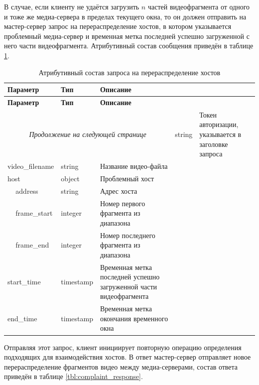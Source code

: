 В случае, если клиенту не удаётся загрузить $n$ частей видеофрагмента от одного и тоже же медиа-сервера в пределах текущего окна, то он должен отправить на мастер-сервер запрос на перераспределение хостов, в котором указывается проблемный медиа-сервер и временная метка последней успешно загруженной с него части видеофрагмента. Атрибутивный состав сообщения приведён в таблице \ref{tbl:complaint_request}.

\begin{longtable}{|p{4cm}|p{2cm}|p{9.5cm}|}
	\caption{Атрибутивный состав запроса на перераспределение хостов}\label{tbl:complaint_request}\\
	\hline
	
	\textbf{Параметр} & \textbf{Тип} & \textbf{Описание}\\ 
	\hline
	\endfirsthead
	
	\hline
	\textbf{Параметр} & \textbf{Тип} & \textbf{Описание}\\ 
	\hline
	\endhead
	
	\hline
	\multicolumn{3}{c}{\textit{Продолжение на следующей странице}}
	\endfoot
	\hline
	\endlastfoot
	
	access\_token &
	string & 
	Токен авторизации, указывается в заголовке запроса \\
	
	\hline
	video\_filename & 
	string & 
	Название видео-файла \\
	
	\hline
	host & 
	object & 
	Проблемный хост \\
	
	\hline
	\,\,\,\,\,\,\,address & 
	string & 
	Адрес хоста \\
	
	\hline
	\,\,\,\,\,\,\,frame\_start & 
	integer & 
	Номер первого фрагмента из диапазона \\
	
	\hline
	\,\,\,\,\,\,\,frame\_end & 
	integer & 
	Номер последнего фрагмента из диапазона \\
	
	\hline
	start\_time & 
	timestamp & 
	Временная метка последней успешно загруженной части видеофрагмента \\
	
	\hline
	end\_time & 
	timestamp & 
	Временная метка окончания временного окна \\
\end{longtable}

Отправляя этот запрос, клиент инициирует повторную операцию определения подходящих для взаимодействия хостов. В ответ мастер-сервер отправляет новое перераспределение фрагментов видео между медиа-серверами, состав ответа приведён в таблице \ref{tbl:complaint_response}.

